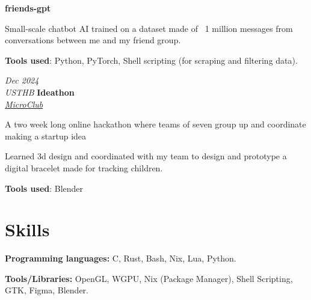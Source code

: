 \documentclass[10pt, letterpaper]{article}
\begin{document}
\vspace{0.10 cm}

\begin{onecolentry}
    \textbf{friends-gpt}
\end{onecolentry}
\begin{onecolentry}
    \begin{highlights}
    \item Small-scale chatbot AI trained on a dataset made of ~1 million messages from
        conversations between me and my friend group.
    \item \textbf{Tools used}: Python, PyTorch, Shell scripting (for scraping and filtering data).
    \end{highlights}
\end{onecolentry}

\vspace{0.15cm}

\begin{twocolentry} {\textit{Dec 2024} \\ \textit{USTHB}}
    \textbf{Ideathon} \\
    \textit{\href{https://www.microclub.info/}{MicroClub}}
\end{twocolentry}
\begin{onecolentry}
    \begin{highlights}
    \item A two week long online hackathon where teams of seven group up and
        coordinate making a startup idea
    \item Learned 3d design and coordinated with my team to design and prototype
        a digital bracelet made for tracking children.
    \item \textbf{Tools used}: Blender

    \end{highlights}
\end{onecolentry}


\section{Skills}
\begin{onecolentry}
    \textbf{Programming languages:} C, Rust, Bash, Nix, Lua, Python.

    \textbf{Tools/Libraries:} OpenGL, WGPU, Nix (Package Manager),
        Shell Scripting, GTK, Figma, Blender.
\end{onecolentry}
\end{document}
